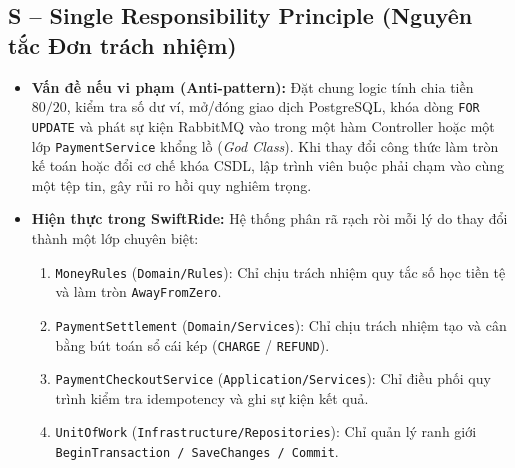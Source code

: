 \documentclass[12pt,a4paper]{article}
\begin{document}
\subsection{S -- Single Responsibility Principle (Nguyên tắc Đơn trách nhiệm)}
\begin{itemize}[nosep]
    \item \textbf{Vấn đề nếu vi phạm (Anti-pattern):} Đặt chung logic tính chia tiền $80/20$, kiểm tra số dư ví, mở/đóng giao dịch PostgreSQL, khóa dòng \texttt{FOR UPDATE} và phát sự kiện RabbitMQ vào trong một hàm Controller hoặc một lớp \texttt{PaymentService} khổng lồ (\textit{God Class}). Khi thay đổi công thức làm tròn kế toán hoặc đổi cơ chế khóa CSDL, lập trình viên buộc phải chạm vào cùng một tệp tin, gây rủi ro hồi quy nghiêm trọng.
    \item \textbf{Hiện thực trong SwiftRide:} Hệ thống phân rã rạch ròi mỗi lý do thay đổi thành một lớp chuyên biệt:
    \begin{enumerate}[nosep]
        \item \texttt{MoneyRules} (\texttt{Domain/Rules}): Chỉ chịu trách nhiệm quy tắc số học tiền tệ và làm tròn \texttt{AwayFromZero}.
        \item \texttt{PaymentSettlement} (\texttt{Domain/Services}): Chỉ chịu trách nhiệm tạo và cân bằng bút toán sổ cái kép (\texttt{CHARGE} / \texttt{REFUND}).
        \item \texttt{PaymentCheckoutService} (\texttt{Application/Services}): Chỉ điều phối quy trình kiểm tra idempotency và ghi sự kiện kết quả.
        \item \texttt{UnitOfWork} (\texttt{Infrastructure/Repositories}): Chỉ quản lý ranh giới \texttt{BeginTransaction / SaveChanges / Commit}.
    \end{enumerate}
\end{itemize}
\end{document}
